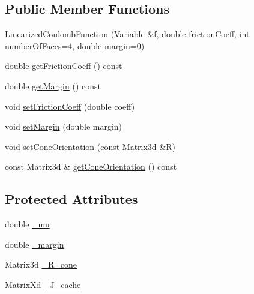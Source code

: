 \subsection*{Public Member Functions}
\begin{DoxyCompactItemize}
\item 
\hyperlink{classocra_1_1LinearizedCoulombFunction_af80b2f4c57d291f389f4e9e4435f3baa}{Linearized\+Coulomb\+Function} (\hyperlink{classocra_1_1Variable}{Variable} \&f, double friction\+Coeff, int number\+Of\+Faces=4, double margin=0)
\end{DoxyCompactItemize}
{\bf }\par
\begin{DoxyCompactItemize}
\item 
double \hyperlink{classocra_1_1LinearizedCoulombFunction_a392b8054e54449a81202ae9682211d32}{get\+Friction\+Coeff} () const
\item 
double \hyperlink{classocra_1_1LinearizedCoulombFunction_af709532102470f85296dd631c8d9c6cf}{get\+Margin} () const
\item 
void \hyperlink{classocra_1_1LinearizedCoulombFunction_ab01ef6ae4c98929ebc4ef1035fe3df47}{set\+Friction\+Coeff} (double coeff)
\item 
void \hyperlink{classocra_1_1LinearizedCoulombFunction_ae220b1da32667c6ba6125af02a170113}{set\+Margin} (double margin)
\item 
void \hyperlink{classocra_1_1LinearizedCoulombFunction_a682565ed83043ec13a966bd0db51f123}{set\+Cone\+Orientation} (const Matrix3d \&R)
\item 
const Matrix3d \& \hyperlink{classocra_1_1LinearizedCoulombFunction_af503cd2489d6cdc131e5bbd526586954}{get\+Cone\+Orientation} () const
\end{DoxyCompactItemize}

\subsection*{Protected Attributes}
\begin{DoxyCompactItemize}
\item 
double \hyperlink{classocra_1_1LinearizedCoulombFunction_a18cfee3d5d056443d2fe1980b4899fa4}{\+\_\+mu}
\item 
double \hyperlink{classocra_1_1LinearizedCoulombFunction_abf137cc7ce5ea91ffa25a95feebddbd1}{\+\_\+margin}
\item 
Matrix3d \hyperlink{classocra_1_1LinearizedCoulombFunction_abf999f311e6563224a5ac852f44e7af4}{\+\_\+\+R\+\_\+cone}
\item 
Matrix\+Xd \hyperlink{classocra_1_1LinearizedCoulombFunction_aa94e64532f28678c15ff1696f7c25684}{\+\_\+\+J\+\_\+cache}
\end{DoxyCompactItemize}
